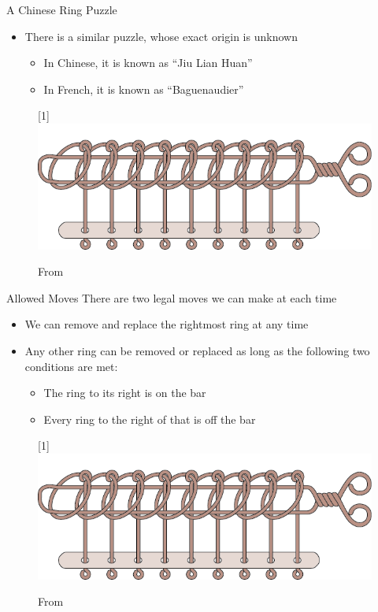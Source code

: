 \documentclass[aspectratio=169]{beamer}
\begin{document}
\begin{frame}{A Chinese Ring Puzzle}
    \begin{itemize}
        \item There is a similar puzzle, whose exact origin is unknown
        \begin{itemize}
            \item In Chinese, it is known as ``Jiu Lian Huan''
            \item In French, it is known as ``Baguenaudier''
        \end{itemize}
    \end{itemize}
    \begin{figure}
        \centering
        \scalebox{-1}[1]{\includegraphics[scale=0.50]{images/baguenaudier_9.png}}
        \caption{From \cite{chinese_puzzle}}
    \end{figure}
\end{frame}

\begin{frame}{Allowed Moves}
    There are two legal moves we can make at each time
    \begin{itemize}
        \item We can remove and replace the rightmost ring at any time
        \item Any other ring can be removed or replaced as long as the following two conditions are met:
        \begin{itemize}
            \item The ring to its right is on the bar
            \item Every ring to the right of that is off the bar
        \end{itemize}
    \end{itemize}
    \begin{figure}
        \centering
        \scalebox{-1}[1]{\includegraphics[scale=0.40]{images/baguenaudier_9.png}}
        \caption{From \cite{chinese_puzzle}}
    \end{figure}
\end{frame}
\end{document}
